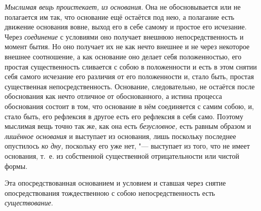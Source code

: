 {\em Мыслимая вещь проистекает, из основания}. Она не обосновывается или не
полагается им так, что основание ещё остаётся под нею, а полагание есть
движение основания вовне, выход его в себе самому и простое его исчезание.
Через {\em соединение} с условиями оно получает внешнюю непосредственность и
момент бытия. Но оно получает их не как нечто внешнее и не через некоторое
внешнее соотношение, а как основание оно делает себя положенностью, его простая
существенность сливается с собою в положенности и есть в этом снятии себя
самого исчезание его различия от его положенности и, стало быть, простая
существенная непосредственность. Основание, следовательно, не остаётся после
обоснования как нечто отличное от обоснованного, а истина процесса обоснования
состоит в том, что основание в нём соединяется с самим собою, и, стало быть,
его рефлексия в другое есть его рефлексия в себя само. Поэтому мыслимая вещь
точно так же, как она есть {\em безусловное,} есть равным образом
и {\em лишённое основания} и выступает из основания, лишь поскольку последнее
опустилось {\em ко дну,} поскольку его уже нет, "--- выступает из того, что не
имеет основания, т.~е. из собственной существенной отрицательности или
чистой формы.

Эта опосредствованная основанием и условием и ставшая через снятие
опосредствования тождественною с собою непосредственность есть
{\em существование}.

\bigskip
